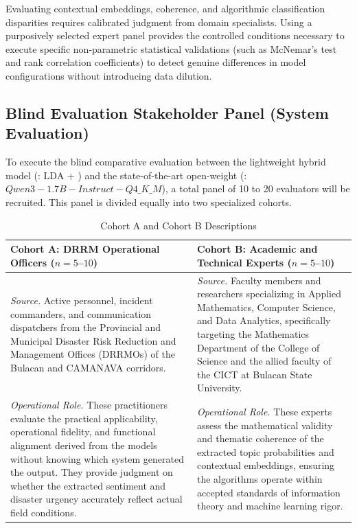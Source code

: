 Evaluating contextual embeddings, coherence, and algorithmic classification
disparities requires calibrated judgment from domain specialists. Using a
purposively selected expert panel provides the controlled conditions necessary
to execute specific non-parametric statistical validations (such as McNemar's
test and rank correlation coefficients) to detect genuine differences in model
configurations without introducing data dilution.

\subsection*{Blind Evaluation Stakeholder Panel (System Evaluation)}

To execute the blind comparative evaluation between the lightweight hybrid model
(\sysA: LDA + \xlmr) and the state-of-the-art open-weight
(\sysB: $Qwen3-1.7B-Instruct-Q4\_K\_M$), a total panel of 10 to 20 evaluators will be recruited. This panel is
divided equally into two specialized cohorts.

\begin{table}[htbp]
	\centering
	\caption{Cohort A and Cohort B Descriptions}
	\label{tab:cohorts}
	\begin{tabularx}{\textwidth}{XX}
		\toprule
		\textbf{Cohort A: DRRM Operational Officers ($n = 5$--$10$)} &
		\textbf{Cohort B: Academic and Technical Experts ($n = 5$--$10$)} \\
		\midrule
		\textit{Source.} Active personnel, incident commanders, and communication
		dispatchers from the Provincial and Municipal Disaster Risk Reduction and
		Management Offices (DRRMOs) of the Bulacan and CAMANAVA corridors. &
		\textit{Source.} Faculty members and researchers specializing in Applied
		Mathematics, Computer Science, and Data Analytics, specifically targeting
		the Mathematics Department of the College of Science and the allied faculty
		of the CICT at Bulacan State University. \\
		\addlinespace
		\textit{Operational Role.} These practitioners evaluate the practical
		applicability, operational fidelity, and functional alignment derived from
		the models without knowing which system generated the output. They provide
		judgment on whether the extracted sentiment and disaster urgency accurately
		reflect actual field conditions. &
		\textit{Operational Role.} These experts assess the mathematical validity
		and thematic coherence of the extracted topic probabilities and contextual
		embeddings, ensuring the algorithms operate within accepted standards of
		information theory and machine learning rigor. \\
		\bottomrule
	\end{tabularx}
\end{table}

